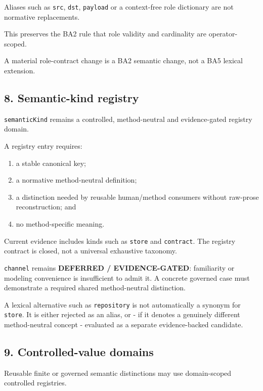\documentclass[
  10pt,
  a4paper,
]{article}
\providecommand{\tightlist}{%
  \setlength{\itemsep}{0pt}\setlength{\parskip}{0pt}}
\begin{document}
Aliases such as \texttt{src}, \texttt{dst}, \texttt{payload} or a
context-free role dictionary are not normative replacements.

This preserves the BA2 rule that role validity and cardinality are
operator-scoped.

A material role-contract change is a BA2 semantic change, not a BA5
lexical extension.

\subsection{8. Semantic-kind registry}\label{8-semantic-kind-registry}

\texttt{semanticKind} remains a controlled, method-neutral and
evidence-gated registry domain.

A registry entry requires:

\begin{enumerate}
\def\labelenumi{\arabic{enumi}.}
\tightlist
\item
  a stable canonical key;
\item
  a normative method-neutral definition;
\item
  a distinction needed by reusable human/method consumers without
  raw-prose reconstruction; and
\item
  no method-specific meaning.
\end{enumerate}

Current evidence includes kinds such as \texttt{store} and
\texttt{contract}. The registry contract is closed, not a universal
exhaustive taxonomy.

\texttt{channel} remains \textbf{DEFERRED / EVIDENCE-GATED}: familiarity
or modeling convenience is insufficient to admit it. A concrete governed
case must demonstrate a required shared method-neutral distinction.

A lexical alternative such as \texttt{repository} is not automatically a
synonym for \texttt{store}. It is either rejected as an alias, or - if
it denotes a genuinely different method-neutral concept - evaluated as a
separate evidence-backed candidate.

\subsection{9. Controlled-value
domains}\label{9-controlled-value-domains}

Reusable finite or governed semantic distinctions may use domain-scoped
controlled registries.
\end{document}
